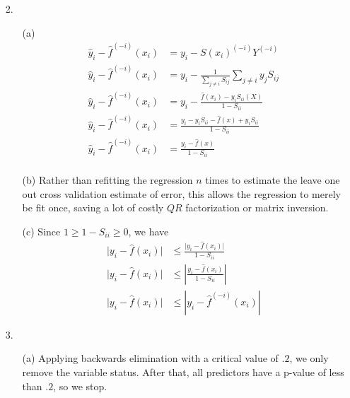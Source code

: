 \documentclass[11pt]{article}
\theoremstyle{definition}
\begin{document}
\begin{itemize}
\begin{itemize}
        \end{itemize}
    \item[2.]
        \begin{itemize}
            \item[(a)]
                \begin{align*}
                    \hat y_i-\hat f^{(-i)}(x_i) &= y_i- S(x_i)^{(-i)}Y^{(-i)} \\
                    \hat y_i-\hat f^{(-i)}(x_i) &= y_i- \frac{1}{\sum_{j\neq i} S_{ij}} \sum_{j\neq i} y_j S_{ij} \\
                    \hat y_i-\hat f^{(-i)}(x_i) &= y_i- \frac{\hat f(x_i)-y_iS_{ii}(X)}{1-S_{ii}} \\
                    \hat y_i-\hat f^{(-i)}(x_i) &= \frac{y_i - y_i S_{ii} - \hat f (x) + y_iS_{ii}}{1- S_{ii}} \\
                    \hat y_i-\hat f^{(-i)}(x_i) &= \frac{y_i -\hat f (x) }{1- S_{ii}} \\
                \end{align*}
            \item[(b)]
                Rather than refitting the regression $n$ times to estimate the leave one out cross validation estimate of error, this allows the regression to merely be fit once, saving a lot of costly $QR$ factorization or matrix inversion.
            \item[(c)]
                Since $1\geq1-S_{ii}\geq0$, we have 
                \begin{align*}
                    \vert y_i - \hat f(x_i) \vert &\leq \frac{\vert y_i - \hat f(x_i) \vert }{1-S_{ii}} \\
                    \vert y_i - \hat f(x_i) \vert &\leq \left\vert\frac{y_i - \hat f(x_i) }{1-S_{ii}} \right\vert  \\
                    \vert y_i - \hat f(x_i) \vert &\leq \left\vert y_i - \hat f^{(-i)}(x_i)\right\vert  
                \end{align*}

        \end{itemize}
    \item[3.]
        \begin{itemize}
            \item[(a)]
                Applying backwards elimination with a critical value of $.2$, we only remove the variable status. After that, all predictors have a p-value of less than $.2$, so we stop. \\
                \smallskip
                

\end{itemize}
\end{itemize}
\end{document}
